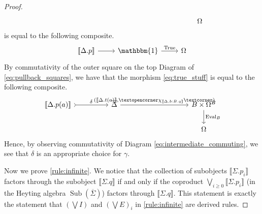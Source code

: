 \documentclass{birkjour}
\theoremstyle{plain}
\theoremstyle{definition}
\newcommand{\adj}[1]{\text{\textopencorner}{#1}\text{\textcorner}}
\begin{document}
\begin{proof}
\begin{equation}
\begin{tikzcd}[column sep = huge]
				&&&& \Omega
			\end{tikzcd}
		\end{equation}
		is equal to the following composite.
		\begin{equation}\label{eq:true_stuff}
			\begin{tikzcd}
				\llbracket \Delta. p\rrbracket\arrow[r] & \mathbbm{1}\arrow[r,"{\operatorname{True}}"] & \Omega
			\end{tikzcd}
		\end{equation}
		By commutativity of the outer square on the top Diagram of \eqref{eq:pullback_squares}, we have that the morphism \eqref{eq:true_stuff} is equal to the following composite.
		\begin{equation}
			\begin{tikzcd}[column sep = huge]
				\llbracket \Delta. p(a)\rrbracket\arrow[r,rightarrowtail,"{\delta}"] & \overline{\Delta}\arrow[rr,"{(\llbracket \Delta. t(a)\rrbracket, \adj{\chi_{\llbracket \Delta, b:B. q\rrbracket}})}"] & & B \times \Omega^B\arrow[d,"{\operatorname{Eval}_B}"]\\
				&&& \Omega
			\end{tikzcd}
		\end{equation}
		Hence, by observing commutativity of Diagram \eqref{eq:intermediate_commuting}, we see that $\delta$ is an appropriate choice for $\gamma$.
		
		Now we prove \eqref{rule:infinite}. We notice that the collection of subobjects $\llbracket \Sigma. p_i\rrbracket$ factors through the subobject $\llbracket \Sigma. q\rrbracket$ if and only if the coproduct $\bigvee_{i \geq 0}\llbracket \Sigma. p_i \rrbracket$ (in the Heyting algebra $\operatorname{Sub}(\overline{\Sigma})$) factors through $\llbracket \Sigma. q \rrbracket$. This statement is exactly the statement that $(\bigvee I)$ and $(\bigvee E)_i$ in \eqref{rule:infinite} are derived rules.
		

\end{proof}
\end{document}
